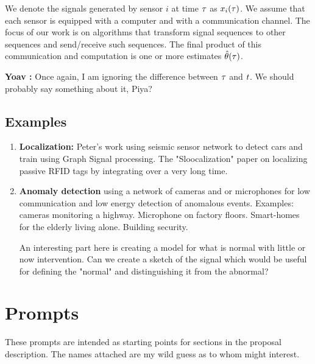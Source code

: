 \documentclass{article}
\newcommand{\comment}[3]{{\color{#1} {\bf #2 :} #3}}
\newcommand{\yoav}[1]{\comment{magenta}{Yoav}{#1}}
\begin{document}
We denote the signals generated by sensor $i$ at time $\tau$ as $x_i(\tau)$. We assume that each sensor is equipped with a computer and with a communication channel. The focus of our work is on algorithms that transform signal sequences to other sequences and send/receive such sequences. The final product of this communication and computation is one or more estimates $\hat{\theta}(\tau)$.

\yoav{Once again, I am ignoring the difference between $\tau$ and $t$. We should probably say something about it, Piya?}

\subsection{Examples}
\begin{enumerate}
    \item {\bf Localization:} Peter's work using seismic sensor network to detect cars and train using Graph Signal processing\cite{riahi2017}. The "Sloocalization" paper on localizing passive RFID tags by integrating over a very long time.
    \item {\bf Anomaly detection} using a network of cameras and or microphones for low communication and low energy detection of anomalous events. Examples: cameras monitoring a highway. Microphone on factory floors. Smart-homes for the elderly living alone. Building security.
    
    An interesting part here is creating a model for what is normal with little or now intervention. Can we create a sketch of the signal which would be useful for defining the "normal" and distinguishing it from the abnormal?
\end{enumerate}

\iffalse
\section{Prompts}
These prompts are intended as starting points for sections in the proposal description. The names attached are my wild guess as to whom might interest.
\end{document}
